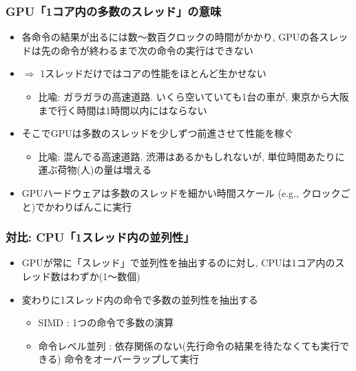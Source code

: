 \documentclass[10pt,dvipdfmx]{beamer}
\begin{document}
\begin{frame}
  \frametitle{GPU「1コア内の多数のスレッド」の意味}
  \begin{itemize}
  \item<1-> 各命令の結果が出るには数〜数百クロックの時間がかかり,
    GPUの各スレッドは先の命令が終わるまで次の命令の実行はできない
  \item<1-> $\Rightarrow$ 1スレッドだけではコアの性能をほとんど生かせない
    \begin{itemize}
    \item 比喩: ガラガラの高速道路. いくら空いていても1台の車が,
      東京から大阪まで行く時間は1時間以内にはならない
    \end{itemize}
  \item<2-> そこでGPUは多数のスレッドを少しずつ前進させて性能を稼ぐ
    \begin{itemize}
    \item 比喩: 混んでる高速道路. 渋滞はあるかもしれないが, 
      単位時間あたりに運ぶ荷物(人)の量は増える
    \end{itemize}
  \item<3-> GPUハードウェアは多数のスレッドを細かい時間スケール
    (e.g., クロックごと)でかわりばんこに実行
  \end{itemize}

\begin{center}
%
\end{center}
\end{frame}

\begin{frame}
  \frametitle{対比: CPU「1スレッド内の並列性」}
  \begin{itemize}
  \item GPUが常に「スレッド」で並列性を抽出するのに対し,
    CPUは1コア内のスレッド数はわずか(1〜数個)
  \item 変わりに1スレッド内の命令で多数の並列性を抽出する
    \begin{itemize}
    \item SIMD : 1つの命令で多数の演算
    \item 命令レベル並列 : 依存関係のない(先行命令の結果を待たなくても実行できる)
      命令をオーバーラップして実行
    \end{itemize}
  \end{itemize}

\begin{center}
%
\end{center}
\end{frame}
\end{document}
